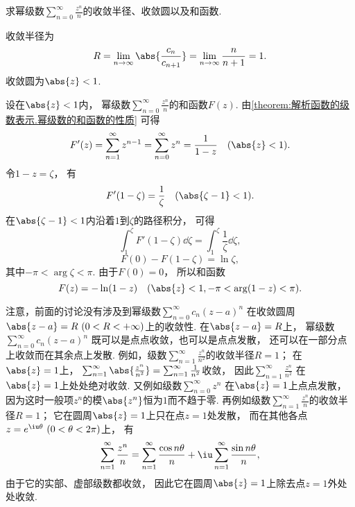 \begin{example}
求幂级数\(\sum_{n=0}^\infty \frac{z^n}{n}\)的收敛半径、收敛圆以及和函数.
\begin{solution}
收敛半径为\begin{equation*}
	R = \lim_{n\to\infty} \abs{\frac{c_n}{c_{n+1}}}
	= \lim_{n\to\infty} \frac{n}{n+1}
	= 1.
\end{equation*}
收敛圆为\(\abs{z} < 1\).

设在\(\abs{z} < 1\)内，
幂级数\(\sum_{n=0}^\infty \frac{z^n}{n}\)的和函数\(F(z)\).
由\cref{theorem:解析函数的级数表示.幂级数的和函数的性质} 可得\begin{equation*}
	F'(z) = \sum_{n=1}^\infty z^{n-1}
	= \sum_{n=0}^\infty z^n
	= \frac{1}{1-z}
	\quad(\abs{z} < 1).
\end{equation*}
令\(1-z = \zeta\)，
有\begin{equation*}
	F'(1-\zeta) = \frac{1}{\zeta}
	\quad(\abs{\zeta-1}<1).
\end{equation*}
在\(\abs{\zeta-1}<1\)内沿着\(1\)到\(\zeta\)的路径积分，
可得\begin{equation*}
	\int_1^{\zeta} F'(1-\zeta) \dd{\zeta}
	= \int_1^{\zeta} \frac{1}{\zeta} \dd{\zeta},
\end{equation*}\begin{equation*}
	F(0) - F(1-\zeta)
	= \ln \zeta,
\end{equation*}
其中\(-\pi < \arg \zeta < \pi\).
由于\(F(0) = 0\)，
所以和函数\begin{equation*}
	F(z) = -\ln(1-z)
	\quad(\abs{z}<1, -\pi < \arg(1-z) < \pi).
\end{equation*}
\end{solution}
\end{example}
注意，前面的讨论没有涉及到幂级数\(\sum_{n=0}^\infty c_n (z-a)^n\)
在收敛圆周\(\abs{z-a}=R\ (0<R<+\infty)\)上的收敛性.
在\(\abs{z-a}=R\)上，
幂级数\(\sum_{n=0}^\infty c_n (z-a)^n\)
既可以是点点收敛，也可以是点点发散，
还可以在一部分点上收敛而在其余点上发散.
例如，级数\(\sum_{n=1}^\infty \frac{z^n}{n^2}\)的收敛半径\(R=1\)；
在\(\abs{z}=1\)上，
\(\sum_{n=1}^\infty \abs{\frac{z^n}{n^2}}
= \sum_{n=1}^\infty \frac{1}{n^2}\)收敛，
因此\(\sum_{n=1}^\infty \frac{z^n}{n^2}\)
在\(\abs{z}=1\)上处处绝对收敛.
又例如级数\(\sum_{n=0}^\infty z^n\)
在\(\abs{z}=1\)上点点发散，
因为这时一般项\(z^n\)的模\(\abs{z^n}\)恒为\(1\)而不趋于零.
再例如级数\(\sum_{n=1}^\infty \frac{z^n}{n}\)的收敛半径\(R=1\)；
它在圆周\(\abs{z}=1\)上只在点\(z=1\)处发散，
而在其他各点\(z = e^{\iu\theta}\ (0<\theta<2\pi)\)上，
有\begin{equation*}
	\sum_{n=1}^\infty \frac{z^n}{n}
	= \sum_{n=1}^\infty \frac{\cos n\theta}{n}
	+ \iu\sum_{n=1}^\infty \frac{\sin n\theta}{n},
\end{equation*}
由于它的实部、虚部级数都收敛，
因此它在圆周\(\abs{z}=1\)上除去点\(z=1\)外处处收敛.

